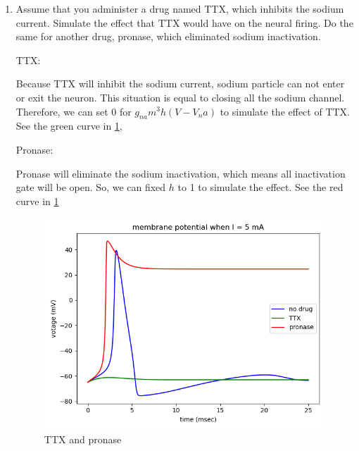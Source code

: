 \documentclass[11pt]{article}
\begin{document}
\begin{enumerate}
		\item Assume that you administer a drug named TTX, which inhibits the sodium current. Simulate the effect that TTX would have on the neural firing. Do the same for another drug, pronase, which eliminated sodium inactivation.
		
		TTX:
		
		Because TTX will inhibit the sodium current, sodium particle can not enter or exit the neuron. This situation is equal to closing all the sodium channel. Therefore, we can set 0 for $g_{na}m^3h(V-V_na)$ to simulate the effect of TTX. See the green curve in \ref{fig:fig5}, 
		
		Pronase:
		
		Pronase will eliminate the sodium inactivation, which means all inactivation gate will be open. So, we can fixed $h$ to 1 to simulate the effect. See the red curve in \ref{fig:fig5}
		
		\begin{figure}[ht]
			\centering
			\includegraphics[scale=0.3]{plot_programming_6.png}
			\caption{TTX and pronase}
			\label{fig:fig5}
		\end{figure}
	\end{enumerate}
\end{document}
